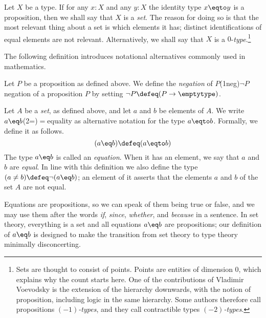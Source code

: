 Let $X$ be a type.  If for any $x:X$ and any $y:X$ the identity
type $x \eqto y$ is a proposition, then we shall say that $X$ is a \emph{set}.%
The reason for doing so is that the most relevant
thing about a set is which elements it has; distinct identifications
of equal elements are not relevant.
Alternatively, we shall say that $X$ is a $0$-\emph{type}.\footnote{%
Sets are thought to consist of points. Points are entities of dimension 0,
which explains why the count starts here.
One of the contributions of Vladimir Voevodsky is the extension of
the hierarchy downwards, with the notion of proposition,
including logic in the same hierarchy.
Some authors therefore call propositions \emph{$(-1)$-types},
and they call contractible types \emph{$(-2)$-types}.}

The following definition introduces notational alternatives
commonly used in mathematics.

\begin{definition}\label{def:neg-eq-ne}
  Let $P$ be a proposition as defined above.
  We define the \emph{negation} of $P$\glossary(1neg){$\neg P$}{negation of a proposition $P$}
  by setting $\neg P \defeq (P \to \emptytype)$.

  Let $A$ be a \emph{set}, as defined above,
  and let $a$ and $b$ be elements of $A$.
  We write $a \eq b$\glossary(2=){$=$}{equality} as alternative
  notation for the type $a \eqto b$.  Formally, we define it as follows.
  \[
  (a \eq b) \defeq (a \eqto b)
  \]
  The type $a \eq b$ is called an \emph{equation}.
  When it has an element, we say that $a$ and $b$ are \emph{equal}.
  In line with this definition we also define the type
  $(a \ne b) \defeq \neg (a \eq b)$; an element of it asserts
  that the elements $a$ and $b$ of the set $A$ are not equal.
\end{definition}

Equations are propositions, so we can speak of them being true or false, and we may use them after the words \emph{if}, \emph{since},
\emph{whether}, and
\emph{because} in a sentence.  In set theory, everything is a set and all equations $a \eq b$ are propositions; our definition of $a \eq b$ is
designed to make the transition from set theory to type theory minimally disconcerting.

